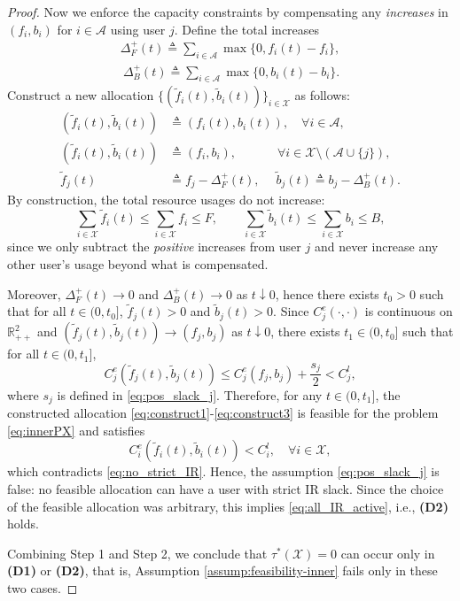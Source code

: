 \documentclass[lettersize,journal]{IEEEtran}
\begin{document}
\begin{proof}
Now we enforce the capacity constraints by compensating any \emph{increases} in $(f_i,b_i)$ for $i\in\mathcal{A}$ using user $j$.
Define the total increases
\begin{align}
    \Delta_F^+(t)\triangleq \sum_{i\in\mathcal{A}} \max\{0, f_i(t)-f_i\},\\\
\Delta_B^+(t)\triangleq \sum_{i\in\mathcal{A}} \max\{0, b_i(t)-b_i\}.
\end{align}
Construct a new allocation $\{(\tilde f_i(t),\tilde b_i(t))\}_{i\in\mathcal{X}}$ as follows:
\begin{align}
(\tilde f_i(t),\tilde b_i(t)) &\triangleq (f_i(t),b_i(t)),\quad \forall i\in\mathcal{A},\label{eq:construct1}\\
(\tilde f_i(t),\tilde b_i(t)) &\triangleq (f_i,b_i), \quad\;\qquad \forall i\in\mathcal{X}\setminus(\mathcal{A}\cup\{j\}),\label{eq:construct2}\\
\tilde f_j(t) &\triangleq f_j-\Delta_F^+(t),\quad\;
\tilde b_j(t) \triangleq b_j-\Delta_B^+(t). \label{eq:construct3}
\end{align}
By construction, the total resource usages do not increase:
\[
\sum_{i\in\mathcal{X}} \tilde f_i(t)
\le \sum_{i\in\mathcal{X}} f_i \le F,\qquad
\sum_{i\in\mathcal{X}} \tilde b_i(t)
\le \sum_{i\in\mathcal{X}} b_i \le B,
\]
since we only subtract the \emph{positive} increases from user $j$ and never increase any other user's usage beyond what is compensated.

Moreover, $\Delta_F^+(t)\to 0$ and $\Delta_B^+(t)\to 0$ as $t\downarrow 0$, hence there exists $t_0>0$ such that for all $t\in(0,t_0]$,
$\tilde f_j(t)>0$ and $\tilde b_j(t)>0$.
Since $C_j^e(\cdot,\cdot)$ is continuous on $\mathbb{R}_{++}^2$ and $(\tilde f_j(t),\tilde b_j(t))\to(f_j,b_j)$ as $t\downarrow 0$, there exists $t_1\in(0,t_0]$ such that for all $t\in(0,t_1]$,
\begin{equation}
\label{eq:j_stays_strict}
C_j^e(\tilde f_j(t),\tilde b_j(t)) \le C_j^e(f_j,b_j)+\frac{s_j}{2} < C_j^l,
\end{equation}
where $s_j$ is defined in \eqref{eq:pos_slack_j}.
Therefore, for any $t\in(0,t_1]$, the constructed allocation \eqref{eq:construct1}-\eqref{eq:construct3} is feasible for the problem \eqref{eq:innerPX} and satisfies
\[
C_i^e(\tilde f_i(t),\tilde b_i(t)) < C_i^l,\quad \forall i\in\mathcal{X},
\]
which contradicts \eqref{eq:no_strict_IR}.
Hence, the assumption \eqref{eq:pos_slack_j} is false: no feasible allocation can have a user with strict IR slack.
Since the choice of the feasible allocation was arbitrary, this implies \eqref{eq:all_IR_active}, i.e., \textbf{(D2)} holds.

\smallskip
Combining Step 1 and Step 2, we conclude that $\tau^*(\mathcal{X})=0$ can occur only in \textbf{(D1)} or \textbf{(D2)}, that is, Assumption \ref{assump:feasibility-inner} fails only in these two cases.
\end{proof}
\end{document}
